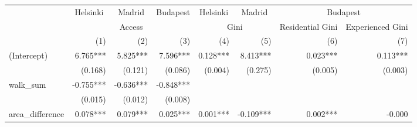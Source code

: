 \begin{tabular}{lrrrrrrr}
\toprule
                      & \multicolumn{1}{c}{Helsinki} & \multicolumn{1}{c}{Madrid} & \multicolumn{1}{c}{Budapest} & \multicolumn{1}{c}{Helsinki} & \multicolumn{1}{c}{Madrid} &                         \multicolumn{2}{c}{Budapest}                        \\ 
\cmidrule(lr){2-2} \cmidrule(lr){3-3} \cmidrule(lr){4-4} \cmidrule(lr){5-5} \cmidrule(lr){6-6} \cmidrule(lr){7-8} 
                      &                                \multicolumn{3}{c}{Access}                                &                  \multicolumn{2}{c}{Gini}                 & \multicolumn{1}{c}{Residential Gini} & \multicolumn{1}{c}{Experienced Gini} \\ 
\cmidrule(lr){2-4} \cmidrule(lr){5-6} \cmidrule(lr){7-7} \cmidrule(lr){8-8} 
                      &                          (1) &                        (2) &                          (3) &                          (4) &                        (5) &                                  (6) &                                  (7) \\ 
\midrule
(Intercept)           &                     6.765*** &                   5.825*** &                     7.596*** &                     0.128*** &                   8.413*** &                             0.023*** &                             0.113*** \\ 
                      &                      (0.168) &                    (0.121) &                      (0.086) &                      (0.004) &                    (0.275) &                              (0.005) &                              (0.003) \\ 
walk\_sum             &                    -0.755*** &                  -0.636*** &                    -0.848*** &                              &                            &                                      &                                      \\ 
                      &                      (0.015) &                    (0.012) &                      (0.008) &                              &                            &                                      &                                      \\ 
area\_difference      &                     0.078*** &                   0.079*** &                     0.025*** &                     0.001*** &                  -0.109*** &                             0.002*** &                               -0.000 \\ 

\end{tabular}
